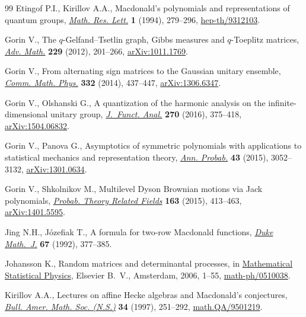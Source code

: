 \documentclass[pdftex]{sigma}
\numberwithin{equation}{section}
\begin{document}
\begin{thebibliography}{99}
Etingof P.I., Kirillov A.A., Macdonald's polynomials and representations of
 quantum groups, \href{https://doi.org/10.4310/MRL.1994.v1.n3.a1}{\textit{Math. Res. Lett.}} \textbf{1} (1994), 279--296,
 \href{https://arxiv.org/abs/hep-th/9312103}{hep-th/9312103}.

Gorin V., The {$q$}-{G}elfand--{T}setlin graph, {G}ibbs measures and
 {$q$}-{T}oeplitz matrices, \href{https://doi.org/10.1016/j.aim.2011.08.016}{\textit{Adv. Math.}} \textbf{229} (2012), 201--266,
 \href{https://arxiv.org/abs/1011.1769}{arXiv:1011.1769}.

Gorin V., From alternating sign matrices to the {G}aussian unitary ensemble,
 \href{https://doi.org/10.1007/s00220-014-2084-z}{\textit{Comm. Math. Phys.}} \textbf{332} (2014), 437--447, \href{https://arxiv.org/abs/1306.6347}{arXiv:1306.6347}.

Gorin V., Olshanski G., A quantization of the harmonic analysis on the
 inf\/inite-dimensional unitary group, \href{https://doi.org/10.1016/j.jfa.2015.06.006}{\textit{J.~Funct. Anal.}} \textbf{270}
 (2016), 375--418, \href{https://arxiv.org/abs/1504.06832}{arXiv:1504.06832}.

Gorin V., Panova G., Asymptotics of symmetric polynomials with applications to
 statistical mechanics and representation theory, \href{https://doi.org/10.1214/14-AOP955}{\textit{Ann. Probab.}}
 \textbf{43} (2015), 3052--3132, \href{https://arxiv.org/abs/1301.0634}{arXiv:1301.0634}.

Gorin V., Shkolnikov M., Multilevel {D}yson {B}rownian motions via {J}ack
 polynomials, \href{https://doi.org/10.1007/s00440-014-0596-2}{\textit{Probab. Theory Related Fields}} \textbf{163} (2015),
 413--463, \href{https://arxiv.org/abs/1401.5595}{arXiv:1401.5595}.

Jing N.H., J\'ozef\/iak T., A formula for two-row {M}acdonald functions,
 \href{https://doi.org/10.1215/S0012-7094-92-06714-7}{\textit{Duke Math.~J.}} \textbf{67} (1992), 377--385.

Johansson K., Random matrices and determinantal processes, in \href{https://doi.org/10.1016/S0924-8099(06)80038-7}{Mathematical
 Statistical Physics}, Elsevier B.~V., Amsterdam, 2006, 1--55,
 \href{https://arxiv.org/abs/math-ph/0510038}{math-ph/0510038}.

Kirillov A.A., Lectures on af\/f\/ine {H}ecke algebras and {M}acdonald's
 conjectures, \href{https://doi.org/10.1090/S0273-0979-97-00727-1}{\textit{Bull. Amer. Math. Soc. (N.S.)}} \textbf{34} (1997),
 251--292, \href{https://arxiv.org/abs/math.QA/9501219}{math.QA/9501219}.


\end{thebibliography}
\end{document}
